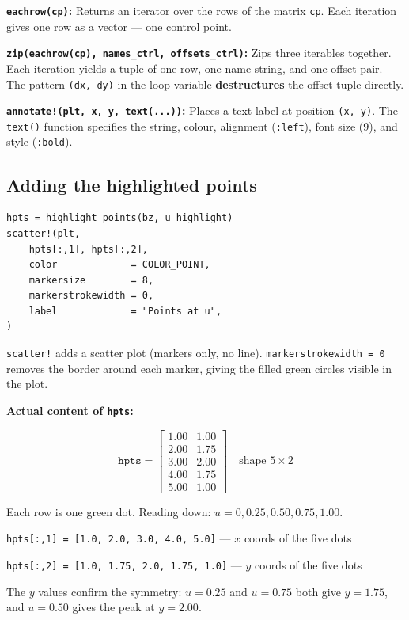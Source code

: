 \documentclass[12pt, a4paper]{article}
\newcommand{\cd}[1]{\texttt{#1}}
\begin{document}
\textbf{\cd{eachrow(cp)}:}
Returns an iterator over the rows of the matrix \cd{cp}.
Each iteration gives one row as a vector --- one control point.

\textbf{\cd{zip(eachrow(cp), names\_ctrl, offsets\_ctrl)}:}
Zips three iterables together.
Each iteration yields a tuple of one row, one name string,
and one offset pair.
The pattern \cd{(dx, dy)} in the loop variable
\textbf{destructures} the offset tuple directly.

\textbf{\cd{annotate!(plt, x, y, text(...))}:}
Places a text label at position \cd{(x, y)}.
The \cd{text()} function specifies the string, colour,
alignment (\cd{:left}), font size (9), and style (\cd{:bold}).

\subsection{Adding the highlighted points}

\begin{verbatim}
hpts = highlight_points(bz, u_highlight)
scatter!(plt,
    hpts[:,1], hpts[:,2],
    color             = COLOR_POINT,
    markersize        = 8,
    markerstrokewidth = 0,
    label             = "Points at u",
)
\end{verbatim}

\cd{scatter!} adds a scatter plot (markers only, no line).
\cd{markerstrokewidth = 0} removes the border around each
marker, giving the filled green circles visible in the plot.

\begin{examplebox}
\textbf{Actual content of \cd{hpts}:}

\[
  \cd{hpts} =
  \begin{bmatrix}
    1.00 & 1.00 \\
    2.00 & 1.75 \\
    3.00 & 2.00 \\
    4.00 & 1.75 \\
    5.00 & 1.00
  \end{bmatrix}
  \quad \text{shape } 5 \times 2
\]

Each row is one green dot.
Reading down: $u=0, 0.25, 0.50, 0.75, 1.00$.

\cd{hpts[:,1] = [1.0, 2.0, 3.0, 4.0, 5.0]} \quad --- $x$ coords of the five dots

\cd{hpts[:,2] = [1.0, 1.75, 2.0, 1.75, 1.0]} \quad --- $y$ coords of the five dots

The $y$ values confirm the symmetry: $u=0.25$ and $u=0.75$
both give $y=1.75$, and $u=0.50$ gives the peak at $y=2.00$.
\end{examplebox}
\end{document}
